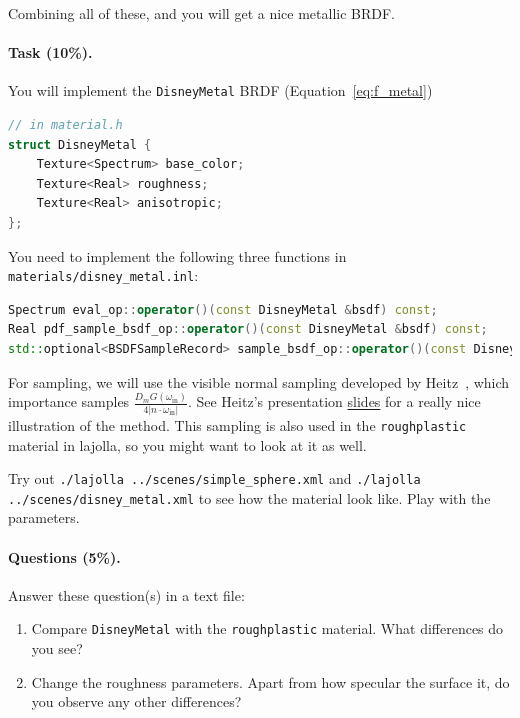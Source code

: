 Combining all of these, and you will get a nice metallic BRDF.

\paragraph{Task (10\%).} You will implement the \lstinline{DisneyMetal} BRDF (Equation~\ref{eq:f_metal})
\begin{lstlisting}[language=c++]
// in material.h
struct DisneyMetal {
    Texture<Spectrum> base_color;
    Texture<Real> roughness;
    Texture<Real> anisotropic;
};
\end{lstlisting}

You need to implement the following three functions in \lstinline{materials/disney_metal.inl}:
\begin{lstlisting}[language=c++]
Spectrum eval_op::operator()(const DisneyMetal &bsdf) const;
Real pdf_sample_bsdf_op::operator()(const DisneyMetal &bsdf) const;
std::optional<BSDFSampleRecord> sample_bsdf_op::operator()(const DisneyMetal &bsdf) const;
\end{lstlisting}

For sampling, we will use the visible normal sampling developed by Heitz~\cite{Heitz:2018:SGD}, which importance samples $\frac{D_m G(\omega_{\text{in}})}{4 |n \cdot \omega_{\text{in}}|}$. See Heitz's presentation \href{https://jcgt.org/published/0007/04/01/slides.pdf}{slides} for a really nice illustration of the method. This sampling is also used in the \lstinline{roughplastic} material in lajolla, so you might want to look at it as well.

Try out \lstinline{./lajolla ../scenes/simple_sphere.xml} and \lstinline{./lajolla ../scenes/disney_metal.xml} to see how the material look like. Play with the parameters.

\paragraph{Questions (5\%).} Answer these question(s) in a text file:
\begin{enumerate}
	\item Compare \lstinline{DisneyMetal} with the \lstinline{roughplastic} material. What differences do you see?
	\item Change the roughness parameters. Apart from how specular the surface it, do you observe any other differences?
\end{enumerate}

